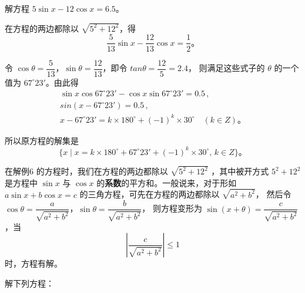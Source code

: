 \liti 解方程 $5\sin x - 12\cos x = 6.5$。

\jie 在方程的两边都除以 $\sqrt{5^2 + 12^2}$，得
$$ \dfrac{5}{13} \sin x - \dfrac{12}{13} \cos x = \dfrac{1}{2} \text{。}$$

令 $\cos\theta = \dfrac{5}{13}$，$\sin\theta = \dfrac{12}{13}$，即令 $tan\theta = \dfrac{12}{5} = 2.4$，
则满足这些式子的 $\theta$ 的一个值为 $67^\circ 23'$。由此得
\begin{gather*}
    \sin x \cos 67^\circ 23' - \cos x \sin 67^\circ 23' = 0.5 \, , \\
    sin(x - 67^\circ 23') = 0.5 \, , \\
    x - 67^\circ 23' = k \times 180^\circ + (-1)^k \times 30^\circ \quad (k \in Z) \text{。}
\end{gather*}

所以原方程的解集是
$$ \{ x \mid x = k \times 180^\circ + 67^\circ 23' + (-1)^k \times 30^\circ ,\, k \in Z \} \text{。}$$

在解例6 的方程时，我们在方程的两边都除以 $\sqrt{5^2 + 12^2}$ ，其中被开方式 $5^2 + 12^2$ 是方程中
$\sin x$ 与 $\cos x$ 的\textbf{系数}的平方和。一般说来，对于形如
$a \sin x + b \cos x = c$ 的三角方程，可先在方程的两边都除以 $\sqrt{a^2 + b^2}$，
然后令 $\cos\theta = \dfrac{a}{\sqrt{a^2 + b^2}}$，$\sin\theta = \dfrac{b}{\sqrt{a^2 + b^2}}$，
则方程变形为 $\sin(x + \theta) = \dfrac{c}{\sqrt{a^2 + b^2}}$，当
$$ \left| \dfrac{c}{\sqrt{a^2 + b^2}} \right| \leqslant 1$$
时，方程有解。

\lianxi

解下列方程：

\begin{xiaotis}









\end{xiaotis}

